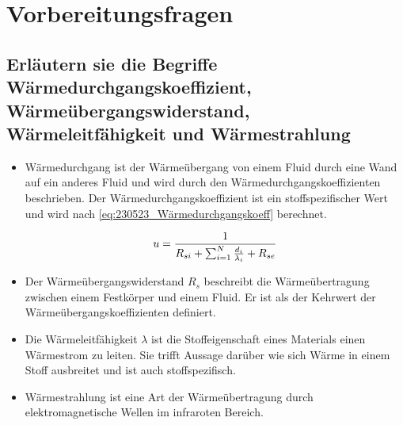 \section{Vorbereitungsfragen}
\subsection{Erläutern sie die Begriffe Wärmedurchgangskoeffizient, Wärmeübergangswiderstand, Wärmeleitfähigkeit und Wärmestrahlung}

\begin{itemize}
\item Wärmedurchgang ist der Wärmeübergang von einem Fluid durch eine Wand auf ein anderes Fluid und wird durch den Wärmedurchgangskoeffizienten beschrieben. Der Wärmedurchgangskoeffizient ist ein stoffspezifischer Wert und wird nach \autoref{eq:230523_Wärmedurchgangskoeff} berechnet. 
 
\begin{equation}
	\centering
	u=\frac{1}{R_{si}+\sum_{i=1}^N \frac{d_i}{\lambda_i}+R_{se}}
	\label{eq:230523_Wärmedurchgangskoeff}
\end{equation}

\item Der Wärmeübergangswiderstand $R_s$ beschreibt die Wärmeübertragung zwischen einem Festkörper und einem Fluid. Er ist als der Kehrwert der Wärmeübergangskoeffizienten definiert.

\item Die Wärmeleitfähigkeit $\lambda$ ist die Stoffeigenschaft eines Materials einen Wärmestrom zu leiten. Sie trifft Aussage darüber wie sich Wärme in einem Stoff ausbreitet und ist auch stoffspezifisch.

\item Wärmestrahlung ist eine Art der Wärmeübertragung durch elektromagnetische Wellen im infraroten Bereich.

\end{itemize}




